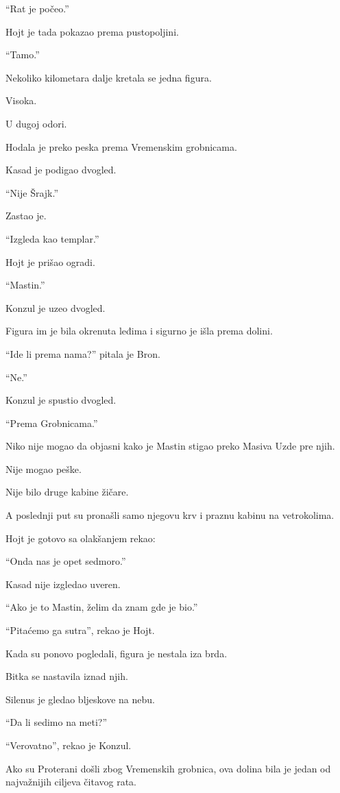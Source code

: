 ``Rat je počeo.''

\bigskip

Hojt je tada pokazao prema pustopoljini.

``Tamo.''

Nekoliko kilometara dalje kretala se jedna figura.

Visoka.

U dugoj odori.

Hodala je preko peska prema Vremenskim grobnicama.

Kasad je podigao dvogled.

``Nije Šrajk.''

Zastao je.

``Izgleda kao templar.''

Hojt je prišao ogradi.

``Mastin.''

Konzul je uzeo dvogled.

Figura im je bila okrenuta leđima i sigurno je išla prema dolini.

``Ide li prema nama?'' pitala je Bron.

``Ne.''

Konzul je spustio dvogled.

``Prema Grobnicama.''

Niko nije mogao da objasni kako je Mastin stigao preko Masiva Uzde pre njih.

Nije mogao peške.

Nije bilo druge kabine žičare.

A poslednji put su pronašli samo njegovu krv i praznu kabinu na vetrokolima.

Hojt je gotovo sa olakšanjem rekao:

``Onda nas je opet sedmoro.''

Kasad nije izgledao uveren.

``Ako je to Mastin, želim da znam gde je bio.''

``Pitaćemo ga sutra'', rekao je Hojt.

Kada su ponovo pogledali, figura je nestala iza brda.

\bigskip

Bitka se nastavila iznad njih.

Silenus je gledao bljeskove na nebu.

``Da li sedimo na meti?''

``Verovatno'', rekao je Konzul.

Ako su Proterani došli zbog Vremenskih grobnica, ova dolina bila je jedan od najvažnijih ciljeva čitavog rata.

